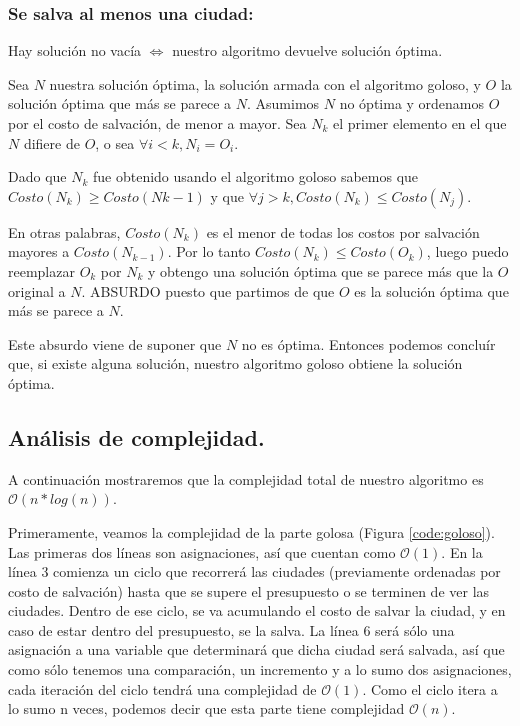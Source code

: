 \subsubsection{Se salva al menos una ciudad:}

Hay solución no vacía $\Longleftrightarrow$ nuestro algoritmo devuelve solución óptima.

Sea $N$ nuestra solución óptima, la solución armada con el algoritmo goloso, y $O$ la solución óptima que más se parece a $N$. Asumimos $N$ no óptima y ordenamos $O$ por el costo de salvación, de menor a mayor.
Sea $N_{k}$ el primer elemento en el que $N$ difiere de $O$, o sea $\forall i<k , N_{i}=O_{i}$.

Dado que $N_{k}$ fue obtenido usando el algoritmo goloso sabemos que $Costo(N_{k}) \geq Costo(N{k-1})$ y que $\forall j>k, Costo(N_{k}) \leq Costo(N_{j})$.

En otras palabras, $Costo(N_{k})$ es el menor de todas los costos por salvación mayores a $Costo(N_{k-1})$. Por lo tanto $Costo(N_{k}) \leq Costo(O_{k})$, luego puedo reemplazar $O_{k}$ por $N_{k}$ y obtengo una solución óptima que se parece más que la $O$ original a $N$. ABSURDO puesto que partimos de que $O$ es la solución óptima que más se parece a $N$.

Este absurdo viene de suponer que $N$ no es óptima.  Entonces podemos concluír que, si existe alguna solución, nuestro algoritmo goloso obtiene la solución óptima.

\vspace*{0.6cm}

\subsection{Análisis de complejidad.}

\vspace*{0.3cm}

A continuación mostraremos que la complejidad total de nuestro algoritmo es $\mathcal{O}(n*log(n))$.

Primeramente, veamos la complejidad de la parte golosa (Figura \ref{code:goloso}).  Las primeras dos líneas son asignaciones, así que cuentan como $\mathcal{O}(1)$. En la línea 3 comienza un ciclo que recorrerá las ciudades (previamente ordenadas por costo de salvación) hasta que se supere el presupuesto o se terminen de ver las ciudades. Dentro de ese ciclo, se va acumulando el costo de salvar la ciudad, y en caso de estar dentro del presupuesto, se la salva.  La línea 6 será sólo una asignación a una variable que determinará que dicha ciudad será salvada, así que como sólo tenemos una comparación, un incremento y a lo sumo dos asignaciones, cada iteración del ciclo tendrá una complejidad de $\mathcal{O}(1)$.  Como el ciclo itera a lo sumo n veces, podemos decir que esta parte tiene complejidad $\mathcal{O}(n)$.

